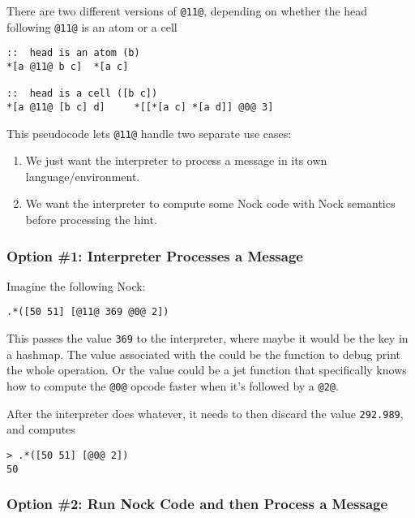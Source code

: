 \documentclass[twoside]{article}
\begin{document}
There are two different versions of \lstinline[style=inlinecode]{@11@}, depending on whether the head following \lstinline[style=inlinecode]{@11@} is an atom or a cell

\begin{lstlisting}[style=listingblock]
::  head is an atom (b)
*[a @11@ b c]  *[a c]

::  head is a cell ([b c])
*[a @11@ [b c] d]     *[[*[a c] *[a d]] @0@ 3]
\end{lstlisting}

This pseudocode lets \lstinline[style=inlinecode]{@11@} handle two separate use cases:

\begin{enumerate}
  \item  We just want the interpreter to process a message in its own language/environment.
  \item  We want the interpreter to compute some Nock code with Nock semantics before processing the hint.
\end{enumerate}

\subsubsection{Option \#1: Interpreter Processes a Message}

Imagine the following Nock:

\begin{lstlisting}[style=listingblock]
.*([50 51] [@11@ 369 @0@ 2])
\end{lstlisting}

\noindent
This passes the value \lstinline[style=inlinecode]{369} to the interpreter, where maybe it would be the key in a hashmap. The value associated with the could be the function to debug print the whole operation. Or the value could be a jet function that specifically knows how to compute the \lstinline[style=inlinecode]{@0@} opcode faster when it's followed by a \lstinline[style=inlinecode]{@2@}.

After the interpreter does whatever, it needs to then discard the value \lstinline[style=inlinecode]{292.989}, and computes

\begin{lstlisting}[style=listingblock]
> .*([50 51] [@0@ 2])
50
\end{lstlisting}

\subsubsection{Option \#2: Run Nock Code and then Process a Message}
\end{document}
